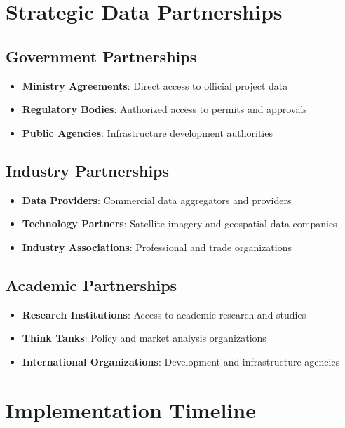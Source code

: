 \documentclass[business]{../templates/infraradar-main}
\begin{document}
\section{Strategic Data Partnerships}

\subsection{Government Partnerships}
\begin{itemize}
    \item \textbf{Ministry Agreements}: Direct access to official project data
    \item \textbf{Regulatory Bodies}: Authorized access to permits and approvals
    \item \textbf{Public Agencies}: Infrastructure development authorities
\end{itemize}

\subsection{Industry Partnerships}
\begin{itemize}
    \item \textbf{Data Providers}: Commercial data aggregators and providers
    \item \textbf{Technology Partners}: Satellite imagery and geospatial data companies
    \item \textbf{Industry Associations}: Professional and trade organizations
\end{itemize}

\subsection{Academic Partnerships}
\begin{itemize}
    \item \textbf{Research Institutions}: Access to academic research and studies
    \item \textbf{Think Tanks}: Policy and market analysis organizations
    \item \textbf{International Organizations}: Development and infrastructure agencies
\end{itemize}

\section{Implementation Timeline}
\end{document}
